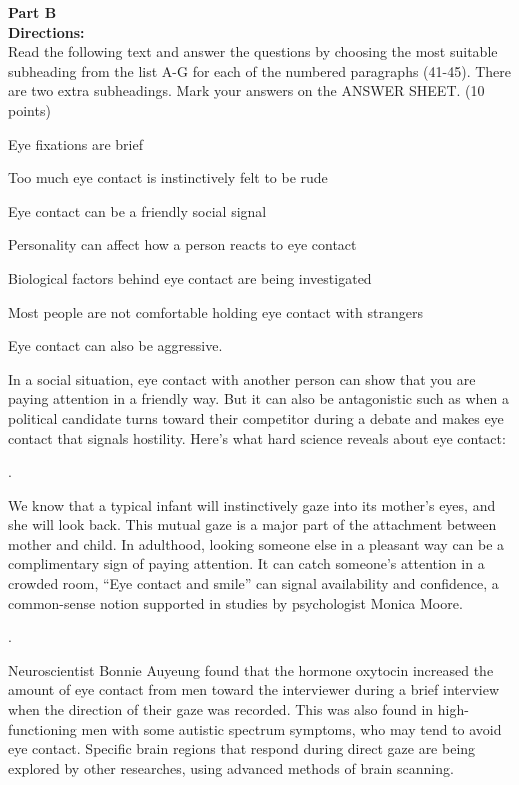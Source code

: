 \newpage
\noindent
\textbf{Part B}\\
\textbf{Directions:}\\
Read the following text and answer the questions by choosing the most
suitable subheading from the list A-G for each of the numbered
paragraphs (41-45). There are two extra subheadings. Mark your answers
on the ANSWER SHEET. (10 points)


\begin{listmatch}
\item 
Eye fixations are brief


\item 
Too much eye contact is instinctively felt to be rude


\item 
Eye contact can be a friendly social signal


\item 
Personality can affect how a person reacts to eye contact


\item 
Biological factors behind eye contact are being investigated


\item 
Most people are not comfortable holding eye contact with
strangers


\item 
Eye contact can also be aggressive.
\end{listmatch}




In a social situation, eye contact with another person can show that you
are paying attention in a friendly way. But it can also be antagonistic
such as when a political candidate turns toward their competitor during
a debate and makes eye contact that signals hostility. Here's what hard
science reveals about eye contact:

\linefill.

We know that a typical infant will instinctively gaze into its mother's
eyes, and she will look back. This mutual gaze is a major part of the
attachment between mother and child. In adulthood, looking someone else
in a pleasant way can be a complimentary sign of paying attention. It
can catch someone's attention in a crowded room, ``Eye contact and
smile'' can signal availability and confidence, a common-sense notion
supported in studies by psychologist Monica Moore.

\linefill.

Neuroscientist Bonnie Auyeung found that the hormone oxytocin increased
the amount of eye contact from men toward the interviewer during a brief
interview when the direction of their gaze was recorded. This was also
found in high-functioning men with some autistic spectrum symptoms, who
may tend to avoid eye contact. Specific brain regions that respond
during direct gaze are being explored by other researches, using
advanced methods of brain scanning.


